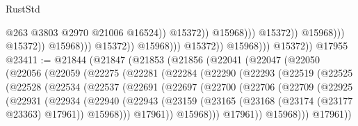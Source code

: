 \begin{lexlean}{RustStd}
\begin{coremodule}
                                                              @263
                                                              @3803
                                                              @2970
                                                              @21006
                                                              @16524))
                                                          @15372))
                                                      @15968)))
                                                @15372))
                                            @15968)))
                                      @15372))
                                  @15968)))
                            @15372))
                        @15968)))
                  @15372))
              @15968)))
        @15372))
    @17955
@23411 := @21844
    (@21847
      (@21853
        (@21856
          (@22041
            (@22047
              (@22050
                (@22056
                  (@22059
                    (@22275
                      (@22281
                        (@22284
                          (@22290
                            (@22293
                              (@22519
                                (@22525
                                  (@22528
                                    (@22534
                                      (@22537
                                        (@22691
                                          (@22697
                                            (@22700
                                              (@22706
                                                (@22709
                                                  (@22925
                                                    (@22931
                                                      (@22934
                                                        (@22940
                                                          (@22943
                                                            (@23159
                                                              (@23165
                                                                (@23168
                                                                  (@23174 (@23177 @23363) @17961))
                                                                @15968)))
                                                          @17961))
                                                      @15968)))
                                                @17961))
                                            @15968)))
                                      @17961))

\end{coremodule}
\end{lexlean}
